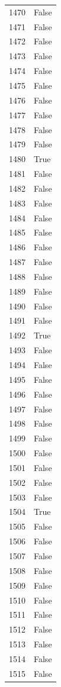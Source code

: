 \documentclass[
  letterpaper,
  DIV=11,
  numbers=noendperiod]{scrreprt}
\begin{document}
\begin{tabular}{ll}
1470 &  False \\
1471 &  False \\
1472 &  False \\
1473 &  False \\
1474 &  False \\
1475 &  False \\
1476 &  False \\
1477 &  False \\
1478 &  False \\
1479 &  False \\
1480 &   True \\
1481 &  False \\
1482 &  False \\
1483 &  False \\
1484 &  False \\
1485 &  False \\
1486 &  False \\
1487 &  False \\
1488 &  False \\
1489 &  False \\
1490 &  False \\
1491 &  False \\
1492 &   True \\
1493 &  False \\
1494 &  False \\
1495 &  False \\
1496 &  False \\
1497 &  False \\
1498 &  False \\
1499 &  False \\
1500 &  False \\
1501 &  False \\
1502 &  False \\
1503 &  False \\
1504 &   True \\
1505 &  False \\
1506 &  False \\
1507 &  False \\
1508 &  False \\
1509 &  False \\
1510 &  False \\
1511 &  False \\
1512 &  False \\
1513 &  False \\
1514 &  False \\
1515 &  False \\

\end{tabular}
\end{document}
